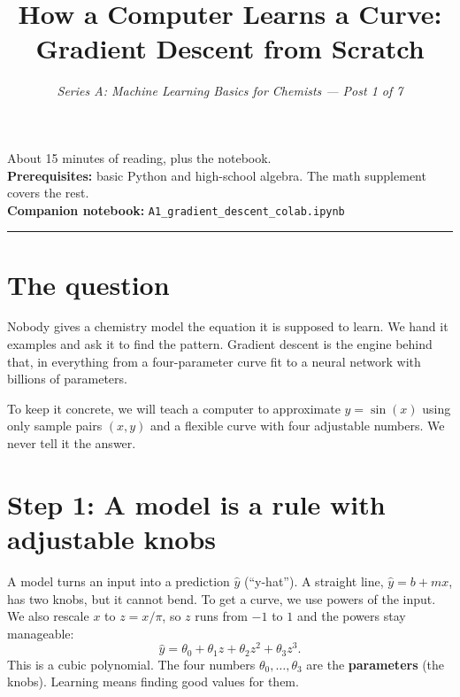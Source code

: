 \documentclass[11pt]{article}
\title{\textbf{How a Computer Learns a Curve:}\\[0.2em]
       Gradient Descent from Scratch}
\author{\textit{Series A: Machine Learning Basics for Chemists --- Post 1 of 7}}
\date{}
\newcommand{\yhat}{\hat{y}}
\newcommand{\colaburl}{https://colab.research.google.com/github/YOUR-USER/YOUR-REPO/blob/main/notebooks/A1_gradient_descent_colab.ipynb}
\newcommand{\colabbutton}{%
  \href{\colaburl}{\tcbox[on line,colback=orange!15,colframe=orange!70!black,boxrule=0.6pt,arc=3pt,
    left=4pt,right=4pt,top=1pt,bottom=1pt]{\small\textbf{$\blacktriangleright$ Open in Google Colab}}}}
\begin{document}
\maketitle
\thispagestyle{empty}

\begin{center}
\small
About 15 minutes of reading, plus the notebook.\\
\textbf{Prerequisites:} basic Python and high-school algebra. The math supplement covers the rest.\\
\textbf{Companion notebook:} \texttt{A1\_gradient\_descent\_colab.ipynb}\\[0.4em]
\colabbutton{}
\end{center}

\vspace{0.5em}
\hrule
\vspace{0.5em}

\section{The question}
Nobody gives a chemistry model the equation it is supposed to learn. We hand it examples and ask it to find the pattern. Gradient descent is the engine behind that, in everything from a four-parameter curve fit to a neural network with billions of parameters.

To keep it concrete, we will teach a computer to approximate $y=\sin(x)$ using only sample pairs $(x,y)$ and a flexible curve with four adjustable numbers. We never tell it the answer.

\section{Step 1: A model is a rule with adjustable knobs}
A model turns an input into a prediction $\yhat$ (``y-hat''). A straight line, $\yhat=b+mx$, has two knobs, but it cannot bend. To get a curve, we use powers of the input. We also rescale $x$ to $z=x/\pi$, so $z$ runs from $-1$ to $1$ and the powers stay manageable:
\begin{equation}
  \yhat=\theta_0+\theta_1 z+\theta_2 z^2+\theta_3 z^3 .
  \label{eq:cubic}
\end{equation}
This is a cubic polynomial. The four numbers $\theta_0,\dots,\theta_3$ are the \textbf{parameters} (the knobs). Learning means finding good values for them.
\end{document}
